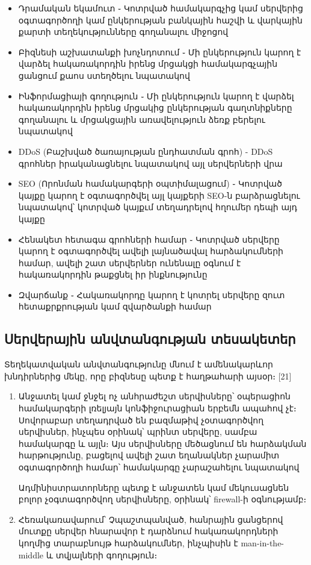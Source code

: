 \documentclass[11pt]{article}
\begin{document}
\begin{sloppypar}
\begin{itemize}
\item Դրամական եկամուտ ֊ Կոտրված համակարգչից կամ սերվերից օգտագործողի
    կամ ընկերության բանկային հաշվի և վարկային քարտի տեղեկությունները
    գողանալու միջոցով
\item Բիզնեսի աշխատանքի խոչնդոտում ֊ Մի ընկերություն կարող է վարձել
    հակառակորդին իրենց մրցակցի համակարգչային ցանցում քաոս ստեղծելու
    նպատակով
\item Ինֆորմացիայի գողություն ֊ Մի ընկերություն կարող է վարձել
    հակառակորդին իրենց մրցակից ընկերության գաղտնիքները գողանալու և
    մրցակցային առավելություն ձեռք բերելու նպատակով
\item DDoS (Բաշխված ծառայության ընդհատման գրոհ) - DDoS գրոհներ
    իրականացնելու նպատակով այլ սերվերների վրա
\item SEO (Որոնման համակարգերի օպտիմալացում) ֊ Կոտրված կայքը կարող է
    օգտագործվել այլ կայքերի SEO-ն բարձրացնելու նպատակով՝ կոտրված կայքւմ
    տեղադրելով հղումեր դեպի այդ կայքը
\item Հենակետ հետագա գրոհների համար ֊ Կոտրված սերվերը կարող է օգտագործվել
    ավելի լայնածավալ հարձակումների համար, ավելի շատ սերվերներ ունենալը
    օգնում է հակառակորդին թաքցնել իր ինքնությունը
\item Զվարճանք ֊ Հակառակորդը կարող է կոտրել սերվերը զուտ հետաքրքրության կամ
    զվարծանքի համար
\end{itemize}


\subsection{Սերվերային անվտանգության տեսակետեր}

Տեղեկատվական անվտանգությունը մնում է ամենակարևոր խնդիրներից մեկը, որը
բիզնեսը պետք է հաղթահարի այսօր։ [21]

\begin{enumerate}
\item Անջատել կամ ջնջել ոչ անհրաժեշտ սերվիսները՝
    օպերացիոն համակարգերի լռելյայն կոնֆիջուրացիան երբեմն ապահով չէ։
    Սովորաբար տեղադրված են բազմաթիվ չօտագործվող սերվիսներ, ինչպես
    օրինակ՝ պրինտ սերվերը, սամբա համակարգը և այլն։ Այս սերվիսները
    մեծացնում են հարձակման հարթությունը, բացելով ավելի շատ եղանակներ
    չարամիտ օգտագործողի համար՝ համակարգը չարաշահելու նպատակով

    Ադմինիստրատորները պետք է անջատեն կամ մեկուսացնեն բոլոր չօգտագործվող
    սերվիսները, օրինակ՝ firewall-ի օգնությամբ։
\item Հեռակառավարում՝
    Չպաշտպանված, հանրային ցանցերով մուտքը սերվեր հնարավոր է դարձնում
    հակառակորդների կողմից տարաբնույթ հարձակումներ, ինչպիսին է
    man-in-the-middle և տվյալների գողություն։


\end{enumerate}
\end{sloppypar}
\end{document}
